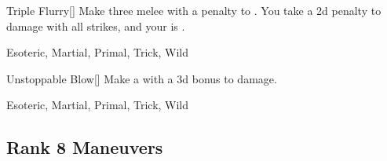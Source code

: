 \lowercase{\hypertarget{maneuver:Triple Flurry}{}}\label{maneuver:Triple Flurry}
\hypertarget{maneuver:Triple Flurry}{}
\begin{freeability}[Rank 7]{Triple Flurry}[]
Make three melee  with a  penalty to .
You take a \minus2d penalty to damage with all strikes, and your  is .


 Esoteric, Martial, Primal, Trick, Wild
\end{freeability}
\vspace{0.25em}



\lowercase{\hypertarget{maneuver:Unstoppable Blow}{}}\label{maneuver:Unstoppable Blow}
\hypertarget{maneuver:Unstoppable Blow}{}
\begin{freeability}[Rank 7]{Unstoppable Blow}[]
Make a  with a \plus3d bonus to damage.


 Esoteric, Martial, Primal, Trick, Wild
\end{freeability}
\vspace{0.25em}


\subsection{Rank 8 Maneuvers}